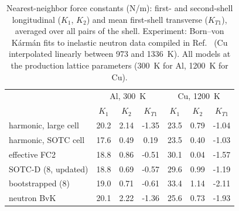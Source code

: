 \begin{table}[t]
\caption{Nearest-neighbor force constants (N/m): first- and second-shell longitudinal ($K_1$, $K_2$) and mean first-shell transverse ($K_{T1}$), averaged over all pairs of the shell. Experiment: Born--von K\'arm\'an fits to inelastic neutron data compiled in Ref.~ (Cu interpolated linearly between 973 and 1336~K). All models at the production lattice parameters (300~K for Al, 1200~K for Cu).}
\label{tab:bvk}
\footnotesize
\begin{ruledtabular}
\begin{tabular}{lcccccc}
 & \multicolumn{3}{c}{Al, 300~K} & \multicolumn{3}{c}{Cu, 1200~K}\\
 & $K_1$ & $K_2$ & $K_{T1}$ & $K_1$ & $K_2$ & $K_{T1}$\\
\hline
harmonic, large cell & 20.2 & 2.14 & -1.35 & 23.5 & 0.79 & -1.04\\
harmonic, SOTC cell & 17.6 & 0.49 & 0.19 & 23.5 & 0.40 & -1.03\\
effective FC2 & 18.8 & 0.86 & -0.51 & 30.1 & 0.04 & -1.57\\
SOTC-D (8, updated) & 18.8 & 0.69 & -0.57 & 29.6 & 0.99 & -1.19\\
bootstrapped (8) & 19.0 & 0.71 & -0.61 & 33.4 & 1.14 & -2.11\\
neutron BvK & 20.1 & 2.22 & -1.36 & 25.6 & 0.73 & -1.93\\
\end{tabular}
\end{ruledtabular}
\end{table}
